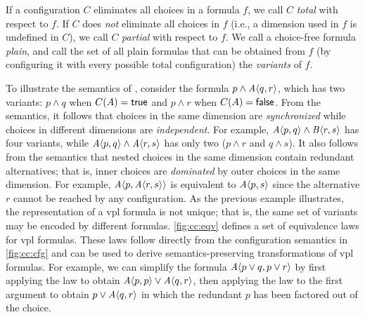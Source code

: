 If a configuration $C$ eliminates all choices in a formula $f$, we call $C$
\emph{total} with respect to $f$. If $C$ does \emph{not} eliminate all choices
in $f$ (i.e., a dimension used in $f$ is undefined in $C$), we call $C$
\emph{partial} with respect to $f$.
%
We call a choice-free formula \emph{plain}, and call the set of all plain
formulas that can be obtained from $f$ (by configuring it with every possible
total configuration) the \emph{variants} of $f$.
%


To illustrate the semantics of \vpl{}, consider the formula
$p\wedge\chc[A]{q,r}$, which has two variants: $p\wedge q$ when $C(A)=\true$
and $p\wedge r$ when $C(A)=\false$.
%
From the semantics, it follows that choices in the same dimension are
\emph{synchronized} while choices in different dimensions are
\emph{independent}. For example, $\chc[A]{p,q}\wedge\chc[B]{r,s}$ has four
variants, while $\chc[A]{p,q}\wedge\chc[A]{r,s}$ has only two ($p\wedge r$ and
$q\wedge s$).
%
It also follows from the semantics that nested choices in the same dimension
contain redundant alternatives; that is, inner choices are \emph{dominated} by
outer choices in the same dimension. For example, $\chc[A]{p,\chc[A]{r,s}}$ is
equivalent to $\chc[A]{p,s}$ since the alternative $r$ cannot be reached by any
configuration.
%
%
%
As the previous example illustrates, the representation of a \ac{vpl} formula is
not unique; that is, the same set of variants may be encoded by different
formulas. \autoref{fig:cc:eqv} defines a set of equivalence laws for \ac{vpl}
formulas. These laws follow directly from the configuration semantics in
\autoref{fig:cc:cfg} and can be used to derive semantics-preserving
transformations of \ac{vpl} formulas.
%
For example, we can simplify the formula $\chc[A]{p\vee q, p\vee r}$ by first
applying the  law to obtain $\chc[A]{p,p}\vee\chc[A]{q,r}$, then applying
the  law to the first argument to obtain $p\vee\chc[A]{q,r}$ in which
the redundant $p$ has been factored out of the choice.

